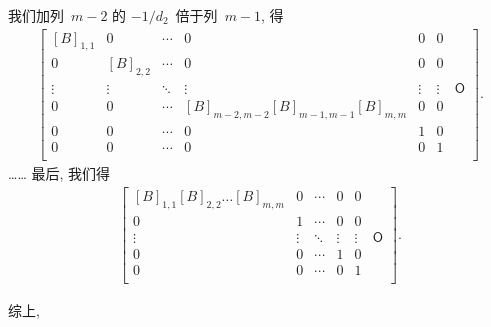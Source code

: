 \documentclass[../libro.tex]{subfiles}
\begin{document}
我们加列~\(m-2\) 的 \(-1/d_2\)~倍于列~\(m-1\), 得
\begin{align*}
    \begin{bmatrix}
        [B]_{1,1} & 0         & \cdots & 0                                     & 0      & 0      & {}         \\
        0         & [B]_{2,2} & \cdots & 0                                     & 0      & 0      & {}         \\
        \vdots    & \vdots    & \ddots & \vdots                                & \vdots & \vdots & \mathsf{O} \\
        0         & 0         & \cdots & [B]_{m-2,m-2} [B]_{m-1,m-1} [B]_{m,m} & 0      & 0      & {}         \\
        0         & 0         & \cdots & 0                                     & 1      & 0      & {}         \\
        0         & 0         & \cdots & 0                                     & 0      & 1      & {}         \\
    \end{bmatrix}.
\end{align*}
……
最后, 我们得
\begin{align*}
    \begin{bmatrix}
        [B]_{1,1} [B]_{2,2} \dots [B]_{m,m} & 0      & \cdots & 0      & 0      & {}         \\
        0                                   & 1      & \cdots & 0      & 0      & {}         \\
        \vdots                              & \vdots & \ddots & \vdots & \vdots & \mathsf{O} \\
        0                                   & 0      & \cdots & 1      & 0      & {}         \\
        0                                   & 0      & \cdots & 0      & 1      & {}         \\
    \end{bmatrix}.
\end{align*}

综上,
\end{document}
